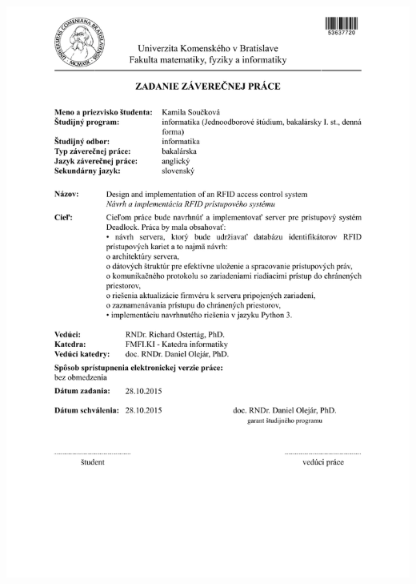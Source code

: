 \vfill


\noindent \mfmiesto\\
\mfautor

\eject %





\newpage
\thispagestyle{empty}
\hspace{-2cm}\includegraphics[width=1.1\textwidth]{src/img/zadanie}


\frontmatter

\setcounter{page}{3}
\newpage
~

